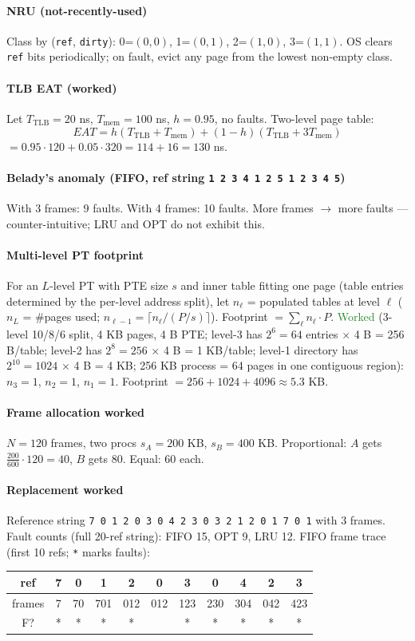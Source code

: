 \paragraph{NRU (not-recently-used)}
Class by (\texttt{ref}, \texttt{dirty}): 0=$(0,0)$, 1=$(0,1)$, 2=$(1,0)$, 3=$(1,1)$. OS clears \texttt{ref} bits periodically; on fault, evict any page from the lowest non-empty class.

\paragraph{TLB EAT (worked)}
Let $T_{\text{TLB}}=20$ ns, $T_{\text{mem}}=100$ ns, $h=0.95$, no faults. Two-level page table:
\[EAT = h(T_{\text{TLB}}+T_{\text{mem}}) + (1-h)(T_{\text{TLB}}+3T_{\text{mem}})\]
$= 0.95\cdot 120 + 0.05\cdot 320 = 114 + 16 = 130$ ns.

\paragraph{Belady's anomaly (FIFO, ref string \texttt{1 2 3 4 1 2 5 1 2 3 4 5})}
With 3 frames: 9 faults. With 4 frames: 10 faults. More frames $\to$ more faults — counter-intuitive; LRU and OPT do not exhibit this.

\paragraph{Multi-level PT footprint}
For an $L$-level PT with PTE size $s$ and inner table fitting one page (table entries determined by the per-level address split), let $n_\ell$ = populated tables at level $\ell$ ($n_L$ = \#pages used; $n_{\ell-1} = \lceil n_\ell/(P/s) \rceil$). Footprint $= \sum_\ell n_\ell \cdot P$.
\textcolor{ForestGreen}{Worked} (3-level 10/8/6 split, 4 KB pages, 4 B PTE; level-3 has $2^6{=}64$ entries $\times$ 4 B = 256 B/table; level-2 has $2^8{=}256$ $\times$ 4 B = 1 KB/table; level-1 directory has $2^{10}{=}1024$ $\times$ 4 B = 4 KB; 256 KB process = 64 pages in one contiguous region):
$n_3=1$, $n_2=1$, $n_1=1$. Footprint $= 256 + 1024 + 4096 \approx 5.3$ KB.

\paragraph{Frame allocation worked}
$N=120$ frames, two procs $s_A=200$ KB, $s_B=400$ KB. Proportional: $A$ gets $\frac{200}{600}\cdot 120=40$, $B$ gets 80. Equal: 60 each.

\paragraph{Replacement worked} Reference string \texttt{7 0 1 2 0 3 0 4 2 3 0 3 2 1 2 0 1 7 0 1} with 3 frames. Fault counts (full 20-ref string): FIFO 15, OPT 9, LRU 12.
FIFO frame trace (first 10 refs; \texttt{*} marks faults):
\begin{tabular}{@{}c|cccccccccc@{}}
ref    & 7 & 0 & 1 & 2 & 0 & 3 & 0 & 4 & 2 & 3 \\\midrule
frames & 7 & 70 & 701 & 012 & 012 & 123 & 230 & 304 & 042 & 423 \\\midrule
F?     & * & * & * & * &   & * & * & * & * & *
\end{tabular}

